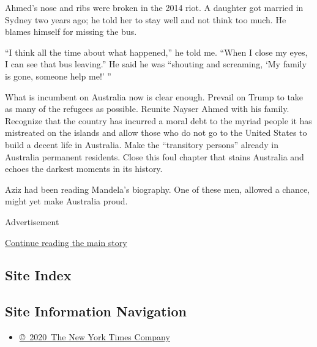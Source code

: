Ahmed's nose and ribs were broken in the 2014 riot. A daughter got
married in Sydney two years ago; he told her to stay well and not think
too much. He blames himself for missing the bus.

``I think all the time about what happened,'' he told me. ``When I close
my eyes, I can see that bus leaving.'' He said he was ``shouting and
screaming, `My family is gone, someone help me!' ''

What is incumbent on Australia now is clear enough. Prevail on Trump to
take as many of the refugees as possible. Reunite Nayser Ahmed with his
family. Recognize that the country has incurred a moral debt to the
myriad people it has mistreated on the islands and allow those who do
not go to the United States to build a decent life in Australia. Make
the ``transitory persons'' already in Australia permanent residents.
Close this foul chapter that stains Australia and echoes the darkest
moments in its history.

Aziz had been reading Mandela's biography. One of these men, allowed a
chance, might yet make Australia proud.

Advertisement

\protect\hyperlink{after-bottom}{Continue reading the main story}

\hypertarget{site-index}{%
\subsection{Site Index}\label{site-index}}

\hypertarget{site-information-navigation}{%
\subsection{Site Information
Navigation}\label{site-information-navigation}}

\begin{itemize}
\tightlist
\item
  \href{https://help.nytimes.com/hc/en-us/articles/115014792127-Copyright-notice}{©~2020~The
  New York Times Company}
\end{itemize}

